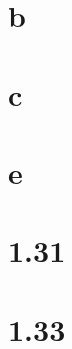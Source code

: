 \documentclass{article}
\begin{document}
\section*{b}

\section*{c}

\section*{e}

\section*{1.31}

\section*{1.33}
\end{document}
